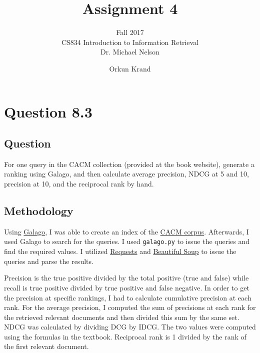 \documentclass[10pt,letterpaper,bibliography=totoc]{scrartcl}
\begin{document}
\author{Orkun Krand}
\title{Assignment 4}
\subtitle{Fall 2017\\ CS834 Introduction to Information Retrieval\\ Dr. Michael Nelson}
\maketitle
\newpage

\section{Question 8.3}
\subsection {Question}
For one query in the CACM collection (provided at the book website), generate a ranking using Galago, and then calculate average precision, NDCG at 5 and 10, precision at 10, and the reciprocal rank by hand.

\subsection{Methodology}
Using \href{https://sourceforge.net/p/lemur/wiki/Galago/}{Galago}, I was able to create an index of the \href{http://www.search-engines-book.com/collections/}{CACM corpus}. Afterwards, I used Galago to search for the queries. I used \texttt{galago.py} to issue the queries and find the required values. I utilized \href{http://docs.python-requests.org/en/master/}{Requests} and \href{https://www.crummy.com/software/BeautifulSoup/}{Beautiful Soup} to issue the queries and parse the results. 

Precision is the true positive divided by the total positive (true and false) while recall is true positive divided by true positive and false negative. In order to get the precision at specific rankings, I had to calculate cumulative precision at each rank. For the average precision, I computed the sum of precisions at each rank for the retrieved relevant documents and then divided this sum by the same set. NDCG was calculated by dividing DCG by IDCG. The two values were computed using the formulas in the textbook\cite{classtext}. Reciprocal rank is 1 divided by the rank of the first relevant document. 
\end{document}
